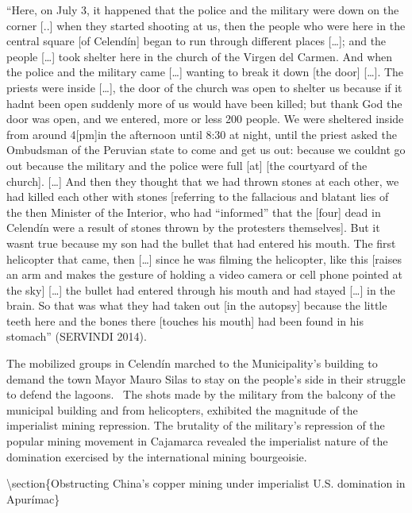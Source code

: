 \documentclass[
]{article}
\begin{document}
``Here, on July 3, it happened that the police and the military were
down on the corner {[}..{]} when they started shooting at us, then the
people who were here in the central square {[}of Celendín{]} began to
run through different places {[}\ldots{]}; and the people {[}\ldots{]}
took shelter here in the church of the Virgen del Carmen. And when the
police and the military came {[}\ldots{]} wanting to break it down
{[}the door{]} {[}\ldots{]}. The priests were inside {[}\ldots{]}, the
door of the church was open to shelter us because if it
hadn\textquotesingle t been open suddenly more of us would have been
killed; but thank God the door was open, and we entered, more or less
200 people. We were sheltered inside from around 4{[}pm{]}in the
afternoon until 8:30 at night, until the priest asked the Ombudsman of
the Peruvian state to come and get us out: because we
couldn\textquotesingle t go out because the military and the police were
full {[}at{]} {[}the courtyard of the church{]}. {[}\ldots{]} And then
they thought that we had thrown stones at each other, we had killed each
other with stones {[}referring to the fallacious and blatant lies of the
then Minister of the Interior, who had ``informed'' that the {[}four{]}
dead in Celendín were a result of stones thrown by the protesters
themselves{]}. But it wasn\textquotesingle t true because my son had the
bullet that had entered his mouth. The first helicopter that came, then
{[}\ldots{]} since he was filming the helicopter, like this {[}raises an
arm and makes the gesture of holding a video camera or cell phone
pointed at the sky{]} {[}\ldots{]} the bullet had entered through his
mouth and had stayed {[}\ldots{]} in the brain. So that was what they
had taken out {[}in the autopsy{]} because the little teeth here and the
bones there {[}touches his mouth{]} had been found in his stomach''
(SERVINDI 2014).

The mobilized groups in Celendín marched to the Municipality's building
to demand the town Mayor Mauro Silas to stay on the people's side in
their struggle to defend the lagoons.~ The shots made by the military
from the balcony of the municipal building and from helicopters,
exhibited the magnitude of the imperialist mining repression. The
brutality of the military's repression of the popular mining movement in
Cajamarca revealed the imperialist nature of the domination exercised by
the international mining bourgeoisie.

\textbackslash section\{Obstructing China's copper mining under
imperialist U.S. domination in Apurímac\}
\end{document}
